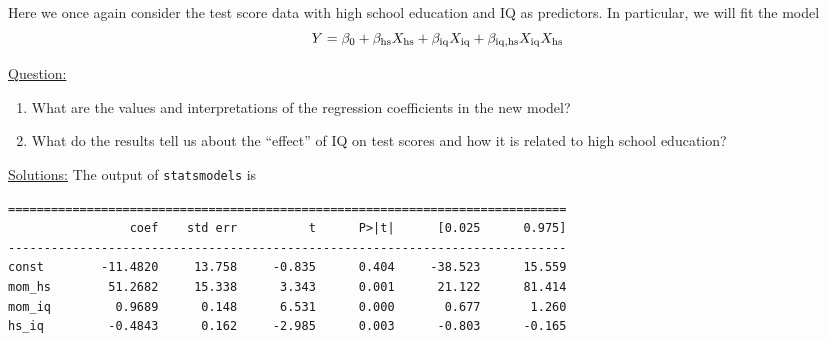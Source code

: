 \begin{example}\label{ex:testscores}
Here we once again consider the test score data with high school education and IQ as predictors. In particular, we will fit the model
\begin{equation*}
Y = \beta_0 + \beta_{\rm hs}X_{\rm hs} + \beta_{\rm iq}X_{\rm iq} + \beta_{\rm iq,hs}X_{\rm iq}X_{\rm hs}
\end{equation*}


\noindent
\underline{Question:} 
\begin{enumerate}[label=(\alph*)]
\item What are the values and interpretations of the regression coefficients in the new model?
\item What do the results tell us about the ``effect'' of IQ on test scores and how it is related to high school education? \\
\end{enumerate}

\noindent
\underline{Solutions:} 
The output of \verb!statsmodels! is 
\begin{Verbatim}
==============================================================================
                 coef    std err          t      P>|t|      [0.025      0.975]
------------------------------------------------------------------------------
const        -11.4820     13.758     -0.835      0.404     -38.523      15.559
mom_hs        51.2682     15.338      3.343      0.001      21.122      81.414
mom_iq         0.9689      0.148      6.531      0.000       0.677       1.260
hs_iq         -0.4843      0.162     -2.985      0.003      -0.803      -0.165
\end{Verbatim}
\vspace{.4cm}


\end{example}
